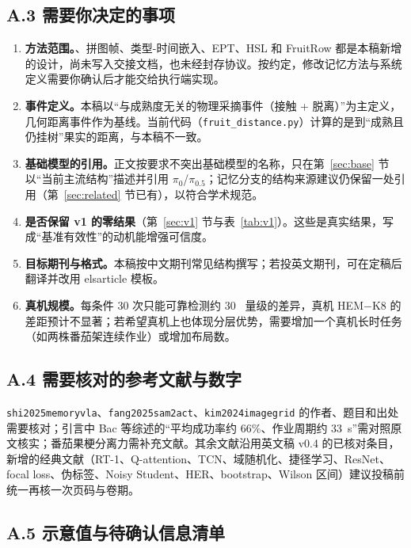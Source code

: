 \subsection*{A.3 需要你决定的事项}
\begin{enumerate}
\item \textbf{方法范围。}\hem{}、拼图帧、类型-时间嵌入、EPT、HSL 和 FruitRow 都是本稿新增的设计，尚未写入交接文档，也未经封存协议。按约定，修改记忆方法与系统定义需要你确认后才能交给执行端实现。
\item \textbf{事件定义。}本稿以“与成熟度无关的物理采摘事件（接触 + 脱离）”为主定义，几何距离事件作为基线。当前代码（\texttt{fruit\_distance.py}）计算的是到“成熟且仍挂树”果实的距离，与本稿不一致。
\item \textbf{基础模型的引用。}正文按要求不突出基础模型的名称，只在第~\ref{sec:base} 节以“当前主流结构”描述并引用 $\pi_0$/$\pi_{0.5}$；记忆分支的结构来源建议仍保留一处引用（第~\ref{sec:related} 节已有），以符合学术规范。
\item \textbf{是否保留 v1 的零结果}（第~\ref{sec:v1} 节与表~\ref{tab:v1}）。这些是真实结果，写成“基准有效性”的动机能增强可信度。
\item \textbf{目标期刊与格式。}本稿按中文期刊常见结构撰写；若投英文期刊，可在定稿后翻译并改用 elsarticle 模板。
\item \textbf{真机规模。}每条件 30 次只能可靠检测约 30~\pp{} 量级的差异，真机 HEM$-$K8 的差距预计不显著；若希望真机上也体现分层优势，需要增加一个真机长时任务（如两株番茄架连续作业）或增加布局数。
\end{enumerate}

\subsection*{A.4 需要核对的参考文献与数字}
\texttt{shi2025memoryvla}、\texttt{fang2025sam2act}、\texttt{kim2024imagegrid} 的作者、题目和出处需要核对；引言中 Bac 等综述的“平均成功率约 66\%、作业周期约 33~s”需对照原文核实；番茄果梗分离力需补充文献。其余文献沿用英文稿 v0.4 的已核对条目，新增的经典文献（RT-1、Q-attention、TCN、域随机化、捷径学习、ResNet、focal loss、伪标签、Noisy Student、HER、bootstrap、Wilson 区间）建议投稿前统一再核一次页码与卷期。

\subsection*{A.5 示意值与待确认信息清单}
{\footnotesize

}
